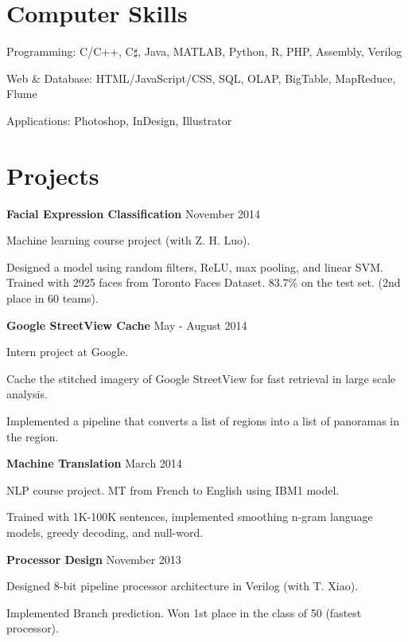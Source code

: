 
\section{\sc Computer Skills} 
\begin{list2}
\item Programming:  C/C++, C$\sharp$, Java, MATLAB, Python, R, PHP, Assembly, Verilog
\item Web \& Database: HTML/JavaScript/CSS, SQL, OLAP, BigTable, MapReduce, Flume
\item Applications: Photoshop, InDesign, Illustrator
\end{list2}

\section{\sc Projects}
{\bf Facial Expression Classification} \hfill {November 2014}\\
\begin{list3}
\item Machine learning course project (with Z. H. Luo).
\item Designed a model using random filters, ReLU, max pooling, and linear SVM. Trained with 2925 faces from Toronto Faces Dataset. 83.7\% on the test set. (2nd place in 60 teams).
\end{list3}

{\bf Google StreetView Cache} \hfill {May - August 2014}\\
\begin{list3}
\item Intern project at Google. 
\item Cache the stitched imagery of Google StreetView for fast retrieval in large scale analysis.
\item Implemented a pipeline that converts a list of regions into a list of panoramas in the region.
\end{list3}

{\bf Machine Translation} \hfill {March 2014}\\
\begin{list3}
\item NLP course project. MT from French to English using IBM1 model.
\item Trained with 1K-100K sentences, implemented smoothing n-gram language models, greedy decoding, and null-word.
\end{list3}

{\bf Processor Design} \hfill {November 2013}\\
\begin{list3}
\item Designed 8-bit pipeline processor architecture in Verilog (with T. Xiao). 
\item Implemented Branch prediction. Won 1st place in the class of 50 (fastest processor).
\end{list3}

